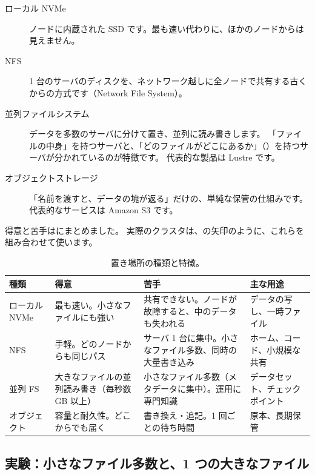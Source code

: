 \begin{description}
\item[ローカル NVMe] ノードに内蔵された SSD です。最も速い代わりに、ほかのノードからは見えません。
\item[NFS] 1 台のサーバのディスクを、ネットワーク越しに全ノードで共有する古くからの方式です（Network File System）。
\item[並列ファイルシステム] データを多数のサーバに分けて置き、並列に読み書きします。
「ファイルの中身」を持つサーバと、「どのファイルがどこにあるか」（）を持つサーバが分かれているのが特徴です。
代表的な製品は Lustre です。
\item[オブジェクトストレージ] 「名前を渡すと、データの塊が返る」だけの、単純な保管の仕組みです。
代表的なサービスは Amazon S3 です。
\end{description}

得意と苦手はにまとめました。
実際のクラスタは、の矢印のように、これらを組み合わせて使います。

\begin{table}[tbp]
\centering
\caption{置き場所の種類と特徴。}
\label{tab:infra-fs}
\footnotesize
\begin{tabular}{l>{\raggedright\arraybackslash}p{30mm}>{\raggedright\arraybackslash}p{33mm}>{\raggedright\arraybackslash}p{30mm}}
\toprule
種類 & 得意 & 苦手 & 主な用途 \\
\midrule
ローカル NVMe & 最も速い。小さなファイルにも強い & 共有できない。ノードが故障すると、中のデータも失われる & データの写し、一時ファイル \\
NFS & 手軽。どのノードからも同じパス & サーバ 1 台に集中。小さなファイル多数、同時の大量書き込み & ホーム、コード、小規模な共有 \\
並列 FS & 大きなファイルの並列読み書き（毎秒数 GB 以上） & 小さなファイル多数（メタデータに集中）。運用に専門知識 & データセット、チェックポイント \\
オブジェクト & 容量と耐久性。どこからでも届く & 書き換え・追記。1 回ごとの待ち時間 & 原本、長期保管 \\
\bottomrule
\end{tabular}
\end{table}

\subsection*{実験：小さなファイル多数と、1 つの大きなファイル}

